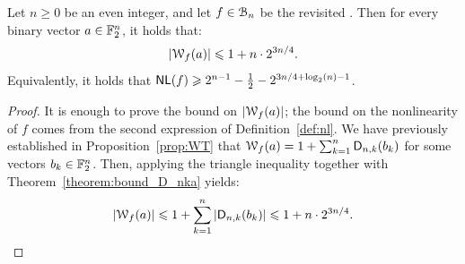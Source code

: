 \documentclass[11pt]{llncs}
\begin{document}
\begin{Corollary}\label{cor:bound_walsh_cauchy}
    Let $n\geq 0$ be an even integer, and let $f\in\mathcal{B}_n$ be the revisited \hwbf{}. Then for every binary vector $a\in\mathbb{F}_2^n$, it holds that:
    \[
        |\mathcal W_{f}(a)|\leqslant 1+n\cdot 2^{3n/4}.
    \]
    Equivalently, it holds that
    $\mathsf{NL}(f)\geqslant 2^{n-1} - \frac{1}{2} -2^{3n/4 + \log_2(n) -1}$.
\end{Corollary}

\begin{proof}
    It is enough to prove the bound on $|\mathcal W_{f}(a)|$; the bound on the nonlinearity of $f$ comes from the second expression of Definition~\ref{def:nl}. We have previously established in Proposition~\ref{prop:WT} that $\mathcal W_{f}(a)=1+\sum_{k=1}^n\mathsf{D}_{n,k}(b_k)$ for some vectors $b_k\in\mathbb{F}_2^n$. Then, applying the triangle inequality together with Theorem~\ref{theorem:bound_D_nka} yields:
    \[
        |\mathcal W_{f}(a)|\leqslant 1+\sum_{k=1}^n\left|\mathsf{D}_{n,k}(b_k)\right|\leqslant 1+ n\cdot 2^{3n/4}.\qedhere
    \]
\end{proof}
\end{document}
